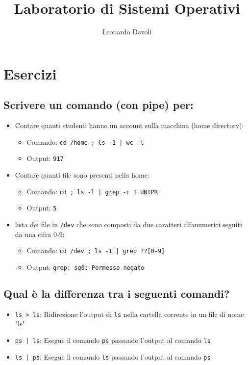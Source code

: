 \documentclass{article}
\author{Leonardo Davoli}
\title{Laboratorio di Sistemi Operativi}
\begin{document}
\maketitle

\setcounter{section}{1} %
\section{Esercizi}

\subsection{Scrivere un comando (con pipe) per:}
\begin{itemize}
    \item Contare quanti studenti hanno un account sulla macchina (home directory):
    \begin{itemize}
        \item Comando: \texttt{cd /home ; ls -1 | wc -l}
        \item Output: \texttt{917}
    \end{itemize}
    \item Contare quanti file sono presenti nella home:
    \begin{itemize}
        \item Comando: \texttt{cd ; ls -l | grep -c 1 UNIPR}
        \item Output: \texttt{5}
    \end{itemize}
    \item lista dei file in \texttt{/dev} che sono composti da due caratteri alfanumerici seguiti da una cifra 0-9:
    \begin{itemize}
        \item Comando: \texttt{cd /dev ; ls -1 | grep ??[0-9]}
        \item Output: \texttt{grep: sg0: Permesso negato}
    \end{itemize}
\end{itemize}

\subsection{Qual è la differenza tra i seguenti comandi?}
\begin{itemize}
    \item \texttt{ls > ls}: Ridirezione l'output di \texttt{ls} nella cartella corrente in un file di nome "ls"
    \item \texttt{ps | ls}: Esegue il comando \texttt{ps} passando l'output al comando \texttt{ls}
    \item \texttt{ls | ps}: Esegue il comando \texttt{ls} passando l'output al comando \texttt{ps}
\end{itemize}
\end{document}
